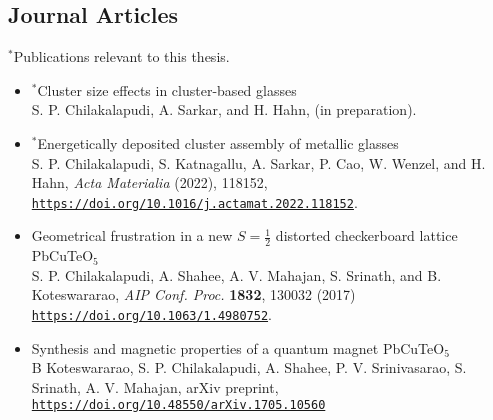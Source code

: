 \subsection*{Journal Articles}
$^*$Publications relevant to this thesis.

\begin{itemize}%
\item \textsf{$^*${Cluster size effects in cluster-based glasses}}\\
S. P. Chilakalapudi, A. Sarkar, and H. Hahn, (in preparation). %

\item \textsf{$^*$Energetically deposited cluster assembly of metallic glasses}\\
S. P. Chilakalapudi, S. Katnagallu, A. Sarkar, P. Cao, W. Wenzel, and H. Hahn, \textit{Acta Materialia} (2022), 118152, \texttt{\href{https://doi.org/10.1016/j.actamat.2022.118152}{https://doi.org/10.1016/j.actamat.2022.118152}}.

\item \textsf{Geometrical frustration in a new $S=\frac{1}{2}$ distorted checkerboard lattice PbCuTeO$_5$}\\
S. P. Chilakalapudi, A. Shahee, A. V. Mahajan, S. Srinath, and B. Koteswararao, \textit{AIP Conf. Proc.} \textbf{1832}, 130032 (2017) \texttt{\href{https://doi.org/10.1063/1.4980752}{https://doi.org/10.1063/1.4980752}}.

\item \textsf{Synthesis and magnetic properties of a quantum magnet PbCuTeO$_5$}\\
B Koteswararao, S. P. Chilakalapudi, A. Shahee, P. V. Srinivasarao, S. Srinath, A. V. Mahajan, arXiv preprint, \texttt{\href{https://doi.org/10.48550/arXiv.1705.10560}{https://doi.org/10.48550/arXiv.1705.10560}}
\end{itemize}

